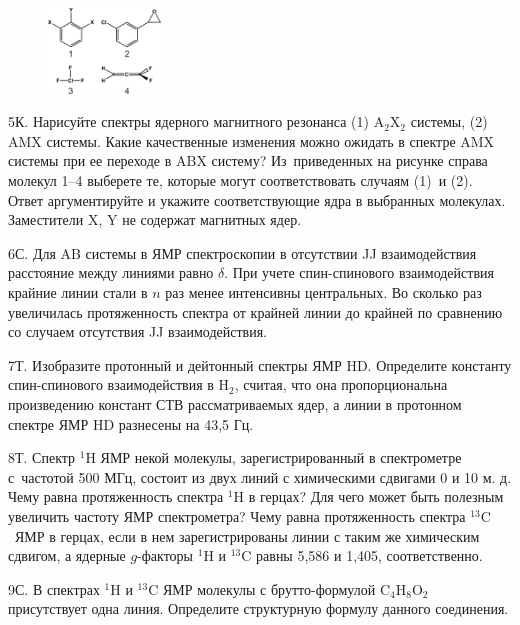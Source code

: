 \par
\begin{figure} %
    \centering
    \vspace{-3.2mm}
    \includegraphics[width=30mm]{images/Fig_2_9_6.png}
    \vspace{-4mm}
\end{figure}
5К. Нарисуйте спектры ядерного магнитного резонанса (1) A$_2$X$_2$ системы, (2) AMX системы. Какие качественные изменения можно ожидать в спектре AMX системы при ее переходе в ABX систему? Из~приведенных на рисунке справа молекул 1–4 выберете те, которые могут соответствовать случаям (1)~и (2). Ответ аргументируйте и укажите соответствующие ядра в выбранных молекулах. Заместители X, Y не содержат магнитных ядер.
\par
6С. Для AB системы в ЯМР спектроскопии в отсутствии JJ взаимодействия расстояние между линиями равно $\delta$. При учете спин-спинового взаимодействия крайние линии стали в $n$ раз менее интенсивны центральных. Во сколько раз увеличилась протяженность спектра от крайней линии до крайней по сравнению со случаем отсутствия JJ взаимодействия.
\par
7Т. Изобразите протонный и дейтонный спектры ЯМР $\text{HD}$. Определите константу спин-спинового взаимодействия в $\text{H}_2$, считая, что она пропорциональна произведению констант СТВ рассматриваемых ядер, а линии в протонном спектре ЯМР $\text{HD}$ разнесены на 43,5 Гц.
\par
8Т. Спектр $^1\text{H}$ ЯМР некой молекулы, зарегистрированный в спектрометре с~частотой 500 МГц, состоит из двух линий с химическими сдвигами 0 и 10 м. д. Чему равна протяженность спектра $^1\text{H}$ в герцах? Для чего может быть полезным увеличить частоту ЯМР спектрометра? Чему равна протяженность спектра $^{13}\text{C}$~ЯМР в герцах, если в нем зарегистрированы линии с таким же химическим сдвигом, а ядерные $g$-факторы $^1\text{H}$ и $^{13}\text{C}$ равны 5,586 и 1,405, соответственно.
\par
9С. В спектрах $^1\text{H}$ и $^{13}\text{C}$ ЯМР молекулы с брутто-формулой $\text{C}_{4}\text{H}_{8}\text{O}_{2}$ присутствует одна линия. Определите структурную формулу данного соединения.
\par
